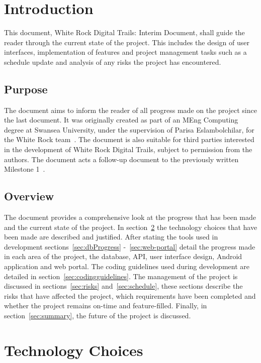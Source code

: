 \documentclass[11pt,a4paper]{article}
\begin{document}


\newpage
\setcounter{page}{1}
\tableofcontents

\newpage
\setcounter{page}{1}
\section{Introduction}
This document, White Rock Digital Trails: Interim Document, shall guide the reader through the current state of the project. This includes the design of user interfaces, implementation of features and project management tasks such as a schedule update and analysis of any risks the project has encountered.
\subsection{Purpose}
The document aims to inform the reader of all progress made on the project since the last document. It was originally created as part of an MEng Computing degree at Swansea University, under the supervision of Parisa Eslambolchilar, for the White Rock team~\cite{whiterock}. The document is also suitable for third parties interested in the development of White Rock Digital Trails, subject to permission from the authors. The document acts a follow-up document to the previously written Milestone 1~\cite{initialDoc}.
\subsection{Overview}
The document provides a comprehensive look at the progress that has been made and the current state of the project. In section~\ref{sec:techChoice} the technology choices that have been made are described and justified. After stating the tools used in development sections~\ref{sec:dbProgress} -~\ref{sec:web-portal} detail the progress made in each area of the project, the database, API, user interface design, Android application and web portal. The coding guidelines used during development are detailed in section~\ref{sec:codingguidelines}. The management of the project is discussed in sections~\ref{sec:risks} and~\ref{sec:schedule}, these sections describe the risks that have affected the project, which requirements have been completed and whether the project remains on-time and feature-filled. Finally, in section~\ref{sec:summary}, the future of the project is discussed.

\section{Technology Choices}
\label{sec:techChoice}
\end{document}
